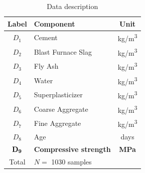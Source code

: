 \documentclass[conference]{IEEEtran}
\begin{document}
\begin{table}[htp]
\caption{Data description}
\begin{center}
  \begin{tabular}{@{} clc @{}}
    \toprule
    Label & Component & Unit \\ 
    \midrule
    $D_1$ & Cement & kg/m\textsuperscript{3} \\ 
    $D_2$ & Blast Furnace Slag & kg/m\textsuperscript{3} \\ 
    $D_3$ & Fly Ash & kg/m\textsuperscript{3} \\ 
    $D_4$ & Water & kg/m\textsuperscript{3} \\ 
    $D_5$ & Superplasticizer & kg/m\textsuperscript{3} \\ 
    $D_6$ & Coarse Aggregate & kg/m\textsuperscript{3} \\ 
    $D_7$ & Fine Aggregate & kg/m\textsuperscript{3} \\ 
    $D_8$ & Age & days \\ 
    ${\bf D_9}$ & {\bf Compressive strength} & {\bf MPa} \\ 
	\midrule
    Total & $N=$ 1030 samples&  \\ 
    \bottomrule
  \end{tabular}
\end{center}
\label{data_description_table}
\end{table}%
\end{document}
